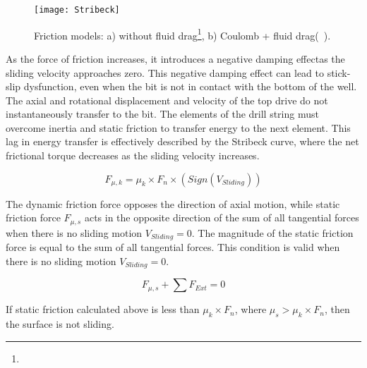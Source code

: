 \begin{figure}
  \centering
  \texttt{[image: Stribeck]}
  \caption[Comparison of friction models]{Friction models: a) without fluid drag\footnote{}, b) Coulomb + fluid drag\footnotemark[\value{footnote}] (~\cite{ref:cayeux2020a}). }
  \label{Friction models}
\end{figure}

As the force of friction increases, it introduces a negative damping effect\needsclarification[How so?]as the sliding velocity approaches zero. This negative damping effect can lead to stick-slip dysfunction, even when the bit is not in contact with the bottom of the well. The axial and rotational displacement and velocity of the top drive do not instantaneously transfer to the bit. The elements of the drill string must overcome inertia and static friction to transfer energy to the next element. This lag in energy transfer is effectively described by the Stribeck curve, where the net frictional torque decreases as the sliding velocity increases.

\begin{equation}\label{dyanmic_force}
  F_{\mu,k} = \mu_{k}\times F_{n} \times (Sign(V_{Sliding}))
\end{equation}

The dynamic friction force opposes the direction of axial motion, while static friction force $F_{\mu,s}$ acts in the opposite direction of the sum of all tangential forces when there is no sliding motion $V_{Sliding}=0$. The magnitude of the static friction force is equal to the sum of all tangential forces. This condition is valid when there is no sliding motion $V_{Sliding}=0$.

\begin{equation}\label{zero}
  F_{\mu,s} + \sum F_{Ext} = 0
\end{equation}

If static friction calculated above is less than $\mu_{k}\times F_{n}$, where $\mu_{s} > \mu_{k}\times F_{n}$, then the surface is not sliding.

